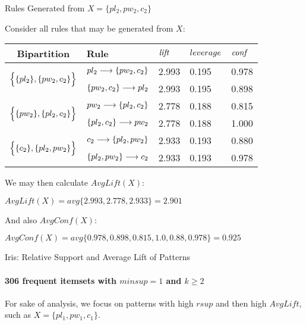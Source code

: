 \begin{frame}{Rules Generated from $X=\{pl_2, pw_2, c_2\}$}

Consider all rules that may be generated from $X$:
\begin{center}
\begin{tabular}{|c|l|l|l|l|}
\hline
Bipartition & Rule & $\mathit{lift}$ &
$leverage$ & $\mathit{conf}$\\\hline\hline
\multirow{2}{*}{$\Bigl\{\{pl_2\}, \{pw_2, c_2\}\Bigr\}$} &
$pl_2 \arule \{pw_2, c_2\}$ & 2.993 & 0.195 & 0.978\\ \cline{2-5}
& $\{pw_2, c_2\} \arule pl_2$ & 2.993 &0.195 & 0.898  \\ \hline
\multirow{2}{*}{$\Bigl\{\{pw_2\}, \{pl_2, c_2\}\Bigr\}$} &
$pw_2 \arule \{ pl_2, c_2\}$ & 2.778 & 0.188 & 0.815 \\ \cline{2-5}
& $\{pl_2, c_2\} \arule pw_2$ & 2.778 &0.188 & 1.000 \\ \hline
\multirow{2}{*}{$\Bigl\{\{c_2\}, \{pl_2, pw_2\}\Bigr\}$} &
$c_2\arule \{pl_2, pw_2\}$ & 2.933 &0.193 & 0.880\\ \cline{2-5}
& $\{pl_2, pw_2\} \arule c_2$ & 2.933 &0.193 & 0.978\\ \hline
\end{tabular}%
\end{center}

We may then calculate $AvgLift(X)$:

\medskip

$AvgLift(X) = avg\{2.993,2.778,2.933\} = 2.901$

\medskip

And also $AvgConf(X)$: 	

\medskip

$AvgConf(X) = avg\{0.978,0.898,0.815,1.0,0.88,0.978\} = 0.925$

\end{frame}


\begin{frame}[fragile]{Iris: Relative Support and Average Lift of Patterns} 
\framesubtitle{306 frequent itemsets with $minsup=1$ and $k\geq2$}
\begin{figure}%
        \centering
	\scalebox{0.75}{
        \psset{dotstyle=Bo,dotscale=1.5,fillcolor=lightgray,
              arrowscale=2,PointName=none}
        \psset{xAxisLabel=$\rsupp$, yAxisLabel= $\mathit{AvgLift}$,
        xAxisLabelPos={c,-0.4in}}%
        \psgraph[tickstyle=bottom,Dx=0.05,Dy=1.0,
                 Ox=0,Oy=0,subticks=2]{->}(0.0,0.0)(0.0,0.0)(0.36,7.5){3.5in}{2.5in}%
        \dataplot[plotstyle=dots,showpoints=true]{\dataSLW}
        \psline[linestyle=dashed](0,2.5)(0.35,2.5)
        \psline[linestyle=dashed](0.1,0)(0.1,7)
        \endpsgraph
	}
\end{figure}

\bigskip

	For sake of analysis, we focus on patterns with high $rsup$ and then high $AvgLift$, such as $X=\{pl_1,pw_1,c_1\}$.
\end{frame}


